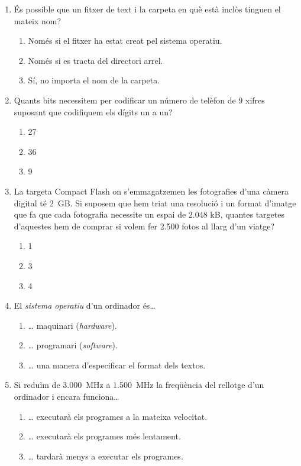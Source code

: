\begin{enumerate}
\item És possible que un fitxer de text i la carpeta en què està
  inclòs tinguen el mateix nom?
  \begin{enumerate}
  \item Només si el fitxer ha estat creat pel sistema operatiu.
  \item Només si es tracta del directori arrel.
  \item Sí, no importa el nom de la carpeta.
  \end{enumerate}

\item Quants bits necessitem per codificar un número de telèfon de 9
  xifres suposant que codifiquem els dígits un a un?
  \begin{enumerate}
  \item 27
  \item 36
  \item 9
  \end{enumerate}

\item La targeta Compact Flash on s'emmagatzemen les fotografies d'una
  càmera digital té 2~GB. Si suposem que hem triat una resolució i un
  format d'imatge que fa que cada fotografia necessite un espai de
  2.048 kB, quantes targetes d'aquestes hem de comprar si volem fer
  2.500 fotos al llarg d'un viatge?
  \begin{enumerate}
  \item 1
  \item 3
  \item 4
  \end{enumerate}

\item El \emph{sistema operatiu} d'un ordinador és{\ldots}
  \begin{enumerate}
  \item {\ldots} maquinari (\emph{hardware}).
  \item {\ldots} programari (\emph{software}).
  \item {\ldots} una manera d'especificar el format dels textos.
  \end{enumerate}

\item Si reduïm de 3.000~MHz a 1.500~MHz la freqüència del rellotge
  d'un ordinador i encara funciona{\ldots}
  \begin{enumerate}
  \item {\ldots} executarà els programes a la mateixa velocitat.
  \item {\ldots} executarà els programes més lentament.
  \item {\ldots} tardarà menys a executar els programes.
  \end{enumerate}


\end{enumerate}
